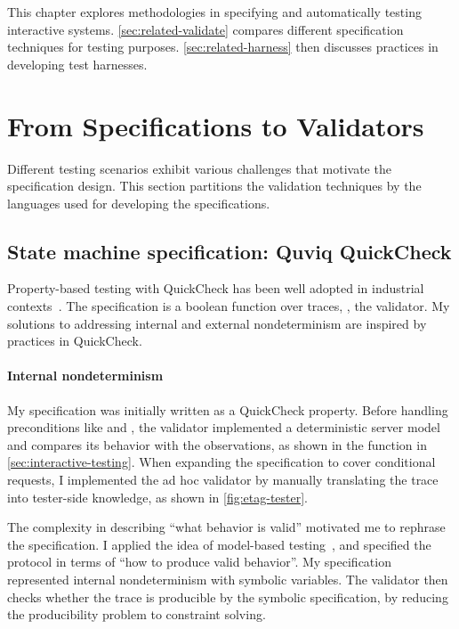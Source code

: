 This chapter explores methodologies in specifying and automatically testing
interactive systems.
\autoref{sec:related-validate} compares different specification
techniques for testing purposes.
\autoref{sec:related-harness} then discusses practices in developing test
harnesses.

\section{From Specifications to Validators}
\label{sec:related-validate}

Different testing scenarios exhibit various challenges that motivate the
specification design.  This section partitions the validation techniques by the
languages used for developing the specifications.

\subsection{State machine specification: Quviq QuickCheck}
Property-based testing with QuickCheck has been well adopted in industrial
contexts~\cite{Hughes2016}.  The specification is a boolean function over traces,
\ie, the validator.  My solutions to addressing internal and external
nondeterminism are inspired by practices in QuickCheck.

\paragraph{Internal nondeterminism}
My \http specification was initially written as a QuickCheck property.  Before
handling preconditions like  and , the
validator implemented a deterministic server model and compares its behavior
with the observations, as shown in the  function in
\autoref{sec:interactive-testing}.  When expanding the specification to cover
conditional requests, I implemented the ad hoc validator by manually translating
the trace into tester-side knowledge, as shown in \autoref{fig:etag-tester}.

The complexity in describing ``what behavior is valid'' motivated me to rephrase
the specification.  I applied the idea of model-based
testing~\cite{broy2005model}, and specified the protocol in terms of ``how to
produce valid behavior''.  My specification represented internal nondeterminism
with symbolic variables.  The validator then checks whether the trace is
producible by the symbolic specification, by reducing the producibility problem
to constraint solving.

